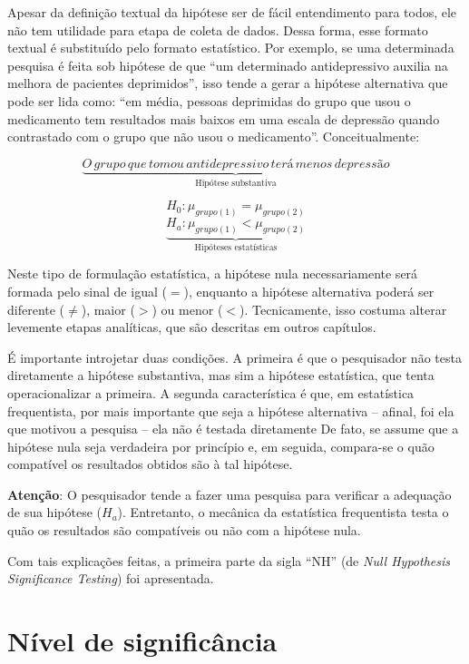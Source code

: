 \documentclass[
]{book}
\begin{document}
Apesar da definição textual da hipótese ser de fácil entendimento para todos, ele não tem utilidade para etapa de coleta de dados. Dessa forma, esse formato textual é substituído pelo formato estatístico. Por exemplo, se uma determinada pesquisa é feita sob hipótese de que ``um determinado antidepressivo auxilia na melhora de pacientes deprimidos'', isso tende a gerar a hipótese alternativa que pode ser lida como: ``em média, pessoas deprimidas do grupo que usou o medicamento tem resultados mais baixos em uma escala de depressão quando contrastado com o grupo que não usou o medicamento''. Conceitualmente:

\[\underbrace{O \,grupo \,que \,tomou \,antidepressivo \,terá \,menos \,depressão}_\text{Hipótese  substantiva}\]

\[H_0: \mu_{grupo (1)} = \mu_{grupo (2)}\]
\[\underbrace{H_a: \mu_{grupo (1)} < \mu_{grupo (2)}}_\text{Hipóteses estatísticas}\]

Neste tipo de formulação estatística, a hipótese nula necessariamente será formada pelo sinal de igual (\(=\)), enquanto a hipótese alternativa poderá ser diferente (\(\neq\)), maior (\(>\)) ou menor (\(<\)). Tecnicamente, isso costuma alterar levemente etapas analíticas, que são descritas em outros capítulos.

É importante introjetar duas condições. A primeira é que o pesquisador não testa diretamente a hipótese substantiva, mas sim a hipótese estatística, que tenta operacionalizar a primeira. A segunda característica é que, em estatística frequentista, por mais importante que seja a hipótese alternativa -- afinal, foi ela que motivou a pesquisa -- ela não é testada diretamente De fato, se assume que a hipótese nula seja verdadeira por princípio e, em seguida, compara-se o quão compatível os resultados obtidos são à tal hipótese.

\textbf{Atenção}: O pesquisador tende a fazer uma pesquisa para verificar a adequação de sua hipótese (\(H_a\)). Entretanto, o mecânica da estatística frequentista testa o quão os resultados são compatíveis ou não com a hipótese nula.

Com tais explicações feitas, a primeira parte da sigla ``NH'' (de \emph{Null Hypothesis Significance Testing}) foi apresentada.

\hypertarget{nuxedvel-de-significuxe2ncia}{%
\section{Nível de significância}\label{nuxedvel-de-significuxe2ncia}}
\end{document}
